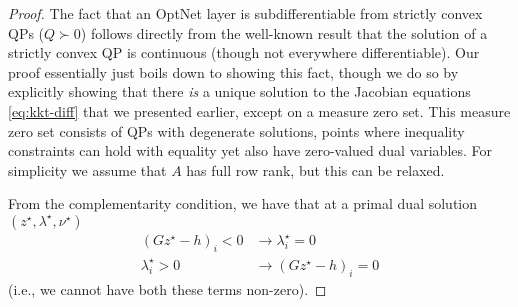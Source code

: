 \begin{proof}
    The fact that an OptNet layer is subdifferentiable from strictly convex QPs
    ($Q \succ 0$) follows directly from the well-known result that the solution of a
    strictly convex QP is continuous (though not everywhere differentiable).  Our
    proof essentially just boils down to showing this fact, though we do so by
    explicitly showing that there \emph{is} a unique solution to the Jacobian
    equations \eqref{eq:kkt-diff} that we presented earlier, except on a measure
    zero set.  This measure zero set consists of QPs with degenerate solutions,
    points where inequality constraints can hold with equality yet also have
    zero-valued dual variables.  For simplicity we assume that $A$ has full row
    rank, but this can be relaxed.

    From the complementarity condition, we have that at a primal dual solution
    $(z^\star, \lambda^\star, \nu^\star)$
    \begin{equation}
        \begin{split}
            (Gz^\star - h)_i < 0 & \rightarrow \lambda^\star_i = 0 \\
            \lambda^\star_i > 0 & \rightarrow (Gz^\star - h)_i = 0
        \end{split}
    \end{equation}
    (i.e., we cannot have both these terms non-zero).


\end{proof}
